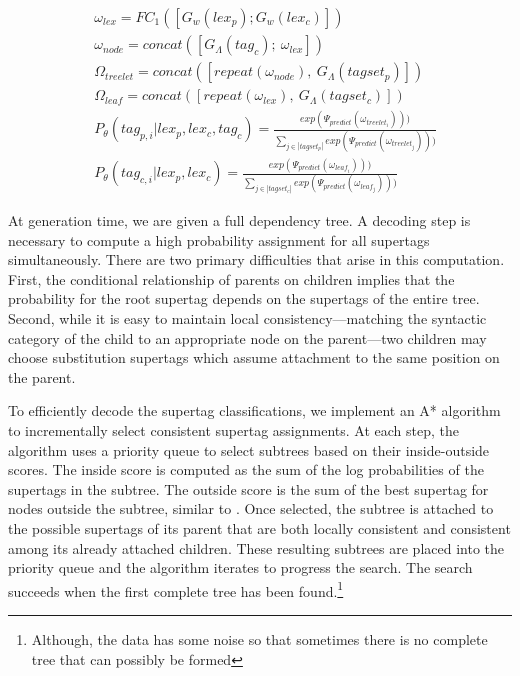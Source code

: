 \documentclass[11pt]{article}
\begin{document}
\begin{align}
&\omega_{lex} = FC_1([G_w(lex_p); G_w(lex_c)]) \label{eq:fergusn} \\
&\omega_{node}=concat([G_\Lambda(tag_c);~\omega_{lex}]) \nonumber \\
&\Omega_{treelet} = concat([repeat(\omega_{node}),~G_\Lambda(tagset_p)]) \nonumber \\
&\Omega_{leaf} = concat([repeat(\omega_{lex}),~G_\Lambda(tagset_c)]) \nonumber \\
&P_\theta(tag_{p,i} | lex_{p}, lex_{c}, tag_{c})=
\frac{exp(\Psi_{predict}(\omega_{treelet_i})))}
{\sum_{j \in |tagset_p|} exp(\Psi_{predict}(\omega_{treelet_j})))} \nonumber \\
&P_\theta(tag_{c,i} |lex_{p}, lex_{c}) = 
\frac{exp(\Psi_{predict}(\omega_{leaf_i})))}
{\sum_{j \in |tagset_c|} exp(\Psi_{predict}(\omega_{leaf_j})))} \nonumber 
\end{align}


At generation time, we are given a full dependency tree.  A decoding
step is necessary to compute a high probability
assignment for all supertags simultaneously.
%
There are two primary difficulties that arise in this computation.
%
First, the conditional relationship of parents on children implies that the probability for the root supertag depends on the supertags of the entire tree.
%
Second, while it is easy to maintain local consistency---matching the syntactic
category of the child to an appropriate node on the parent---two children may choose substitution supertags which assume attachment to the same position on the parent.

To efficiently decode the supertag classifications, we implement an A* algorithm to incrementally select consistent supertag assignments.
%
At each step, the algorithm uses a priority queue to select subtrees based on their inside-outside scores.
%
The inside score is computed as the sum of the log probabilities of the supertags in the subtree.
%
The outside score is the sum of the best supertag for nodes outside the subtree, similar to .
%
Once selected, the subtree is attached to the possible supertags of its parent that are both locally consistent and consistent among its already attached children.
%
These resulting subtrees are placed into the priority queue and the algorithm iterates to progress the search.
%
The search succeeds when the first complete tree has been found.\footnote{Although, the data has some noise so that sometimes there is no complete tree that can possibly be formed}
\end{document}
